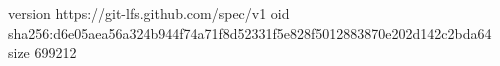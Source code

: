 version https://git-lfs.github.com/spec/v1
oid sha256:d6e05aea56a324b944f74a71f8d52331f5e828f5012883870e202d142c2bda64
size 699212
